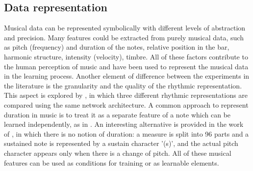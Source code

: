\documentclass{article}
\begin{document}
\subsection{Data representation} \label{subsec: data representation}
Musical data can be represented symbolically with different levels of abstraction and precision. Many features could be extracted from purely musical data, such as pitch (frequency) and duration of the notes, relative position in the bar, harmonic structure, intensity (velocity), timbre. All of these factors contribute to the human perception of music and have been used to represent the musical data in the learning process. Another element of difference between the experiments in the literature is the granularity and the quality of the rhythmic representation. This aspect is explored by \cite{JazzGAN}, in which three different rhythmic representations are compared using the same network architecture. A common approach to represent duration in music is to treat it as a separate feature of a note which can be learned independently, as in \cite{ECMG}. An interesting alternative is provided in the work of \cite{seqAttn}, in which there is no notion of duration: a measure is split into 96 parts and a sustained note is represented by a sustain character '(s)', and the actual pitch character appears only when there is a change of pitch. All of these musical features can be used as conditions for training or as learnable elements. 
\end{document}
